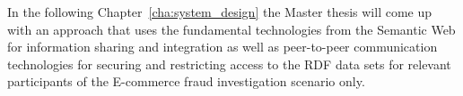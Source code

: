 In the following Chapter~\ref{cha:system_design} the Master thesis will come up with an approach that uses the fundamental technologies from the Semantic Web for information sharing and integration as well as peer-to-peer communication technologies for securing and restricting access to the \gls{RDF} data sets for relevant participants of the \gls{E-commerce} fraud investigation scenario only.

